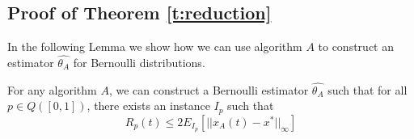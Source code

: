 


\subsection{Proof of Theorem \ref{t:reduction}}
\noindent In the following Lemma we show how we can use algorithm $A$ to construct an estimator $\hat{\theta_A}$ for Bernoulli distributions.
\begin{lemma}\label{l:reduction}
For any algorithm $A$, we can construct a Bernoulli estimator $\hat{\theta_A}$ such that for all $p \in Q([0,1])$, there exists an instance $I_p$ such that $$R_p(t) \leq 2E_{I_p}[||x_A(t)-x^*||_{\infty}]$$
\end{lemma}

